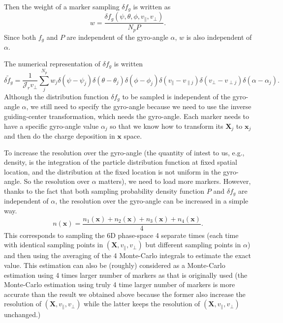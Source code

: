 \documentclass{article}
\begin{document}
Then the weight of a marker sampling $\delta f_g$ is written as
\begin{equation}
  w = \frac{\delta f_g (\psi, \theta, \phi, v_{\parallel}, v_{\perp})}{N_p P}
  .
\end{equation}
Since both $f_g$ and $P$ are independent of the gyro-angle $\alpha$, $w$ is
also independent of $\alpha$.

The numerical representation of $\delta f_g$ is written
\begin{equation}
  \delta \tilde{f}_g = \frac{1}{\mathcal{J}_r v_{\perp}} \sum_j^{N_p} w_j
  \delta (\psi - \psi_j) \delta (\theta - \theta_j) \delta (\phi - \phi_j)
  \delta (v_{\parallel} - v_{\parallel j}) \delta (v_{\perp} - v_{\perp j})
  \delta (\alpha - \alpha_j) .
\end{equation}
Although the distribution function $\delta f_g$ to be sampled is independent
of the gyro-angle $\alpha$, we still need to specify the gyro-angle because we
need to use the inverse guiding-center transformation, which needs the
gyro-angle. Each marker needs to have a specific gyro-angle value $\alpha_j$
so that we know how to transform its $\mathbf{X}_j$ to $\mathbf{x}_j$ and then
do the charge deposition in $\mathbf{x}$ space.

To increase the resolution over the gyro-angle (the quantity of intest to us,
e.g., density, is the integration of the particle distribution function at
fixed spatial location, and the distribution at the fixed location is not
uniform in the gyro-angle. So the resolution over $\alpha$ matters), we need
to load more markers. However, thanks to the fact that both sampling
probability density function $P$ and $\delta f_g$ are independent of $\alpha$,
the resolution over the gyro-angle can be increased in a simple way.
\begin{equation}
  n (\mathbf{x}) = \frac{n_1 (\mathbf{x}) + n_2 (\mathbf{x}) + n_3
  (\mathbf{x}) + n_4 (\mathbf{x})}{4} .
\end{equation}
This corresponds to sampling the 6D phase-space 4 separate times (each time
with identical sampling points in $(\mathbf{X}, v_{\parallel}, v_{\perp})$ but
different sampling points in $\alpha$) and then using the averaging of the 4
Monte-Carlo integrals to estimate the exact value. This estimation can also be
(roughly) considered as a Monte-Carlo estimation using 4 times larger number
of markers as that is originally used (the Monte-Carlo estimation using truly
4 time larger number of markers is more accurate than the result we obtained
above because the former also increase the resolution of $(\mathbf{X},
v_{\parallel}, v_{\perp})$ while the latter keeps the resolution of
$(\mathbf{X}, v_{\parallel}, v_{\perp})$ unchanged.)
\end{document}
